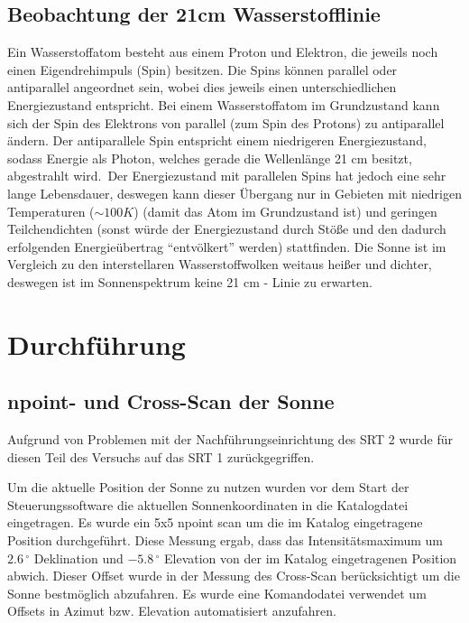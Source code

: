 \subsection{Beobachtung der 21cm Wasserstofflinie}
Ein Wasserstoffatom besteht aus einem Proton und Elektron, die jeweils noch einen Eigendrehimpuls (Spin) besitzen. Die Spins können parallel oder antiparallel angeordnet sein, wobei dies jeweils einen unterschiedlichen Energiezustand entspricht. Bei einem Wasserstoffatom im Grundzustand kann sich der Spin des Elektrons von parallel (zum Spin des Protons) zu antiparallel ändern. Der antiparallele Spin entspricht einem niedrigeren Energiezustand, sodass Energie als Photon, welches gerade die Wellenlänge 21 cm besitzt, abgestrahlt wird.\
Der Energiezustand mit parallelen Spins hat jedoch eine sehr lange Lebensdauer, deswegen kann dieser Übergang nur in Gebieten mit niedrigen Temperaturen ($\sim 100K$) (damit das Atom im Grundzustand ist) und geringen Teilchendichten (sonst würde der Energiezustand durch Stöße und den dadurch erfolgenden Energieübertrag \enquote{entvölkert} werden) stattfinden. Die Sonne ist im Vergleich zu den interstellaren Wasserstoffwolken weitaus heißer und dichter, deswegen ist im Sonnenspektrum keine 21 cm - Linie zu erwarten.

\section{Durchführung}
\subsection{npoint- und Cross-Scan der Sonne}
Aufgrund von Problemen mit der Nachführungseinrichtung des SRT 2 wurde für diesen Teil des Versuchs auf das SRT 1 zurückgegriffen.

Um die aktuelle Position der Sonne zu nutzen wurden vor dem Start der Steuerungssoftware die aktuellen Sonnenkoordinaten in die Katalogdatei eingetragen.
Es wurde ein 5x5 npoint scan um die im Katalog eingetragene Position durchgeführt. Diese Messung ergab, dass das Intensitätsmaximum um $2.6\,^\circ$ Deklination und $-5.8\,^\circ$ Elevation von der im Katalog eingetragenen Position abwich. Dieser Offset wurde in der Messung des Cross-Scan berücksichtigt um die Sonne bestmöglich abzufahren.
Es wurde eine Komandodatei verwendet um Offsets in Azimut bzw. Elevation automatisiert anzufahren.
